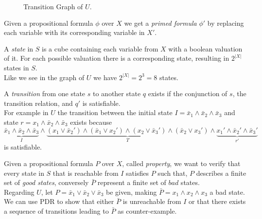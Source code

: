 \documentclass[11pt, a4paper, BCOR=10mm, ngerman, oneside]{scrbook}
\begin{document}
\begin{figure}[H]
\centering

\caption{Transition Graph of $U$.}
\label{ex1}
\end{figure}

Given a propositional formula $\phi$ over $X$ we get a \textsl{primed formula} $\phi'$ by replacing each variable with its corresponding variable in $X'$. \par

A \textsl{state} in $S$ is a cube containing each variable from $X$ with a boolean valuation of it. For each possible valuation there is a corresponding state, resulting in $2^{|X|}$ states in $S$. \\
Like we see in the graph of $U$ we have $2^{|X|} = 2^3 = 8$ states.

A \textsl{transition} from one state $s$ to another state $q$ exists if the conjunction of $s$, the transition relation, and $q'$ is satisfiable.\\ For example in $U$ the transition between the initial state $I = \bar x_1 \land \bar x_2 \land \bar x_3$ and state $r = x_1 \land \bar x_2 \land \bar x_3$ exists because
\begin{equation*}
\underbrace{\bar x_1 \land \bar x_2 \land \bar x_3}_{I} \land \underbrace{(x_1 \lor \bar x_2' ) \land ( \bar x_1 \lor x_2') \land (x_2 \lor \bar x_3') \land ( \bar x_2 \lor x_3')}_T \land \underbrace{x_1' \land \bar x_2' \land \bar x_3'}_{r'}
\end{equation*}
is satisfiable.\par

Given a propositional formula $P$ over $X$, called \textsl{property}, we want
to verify that every state in $S$ that is reachable from
$I$ satisfies $P$ such that, $P$ describes a finite set of \textsl{good states}, conversely $\bar P$ represent a finite set of $bad$ states.  \\ 
Regarding $U$, let $P = \bar x_1 \lor \bar x_2 \lor \bar x_3$ be given, making $\bar P = x_1 \land x_2 \land x_3$ a bad state. \\ 
We can use PDR to show that either $\bar P$ is unreachable from $I$ or that there exists a sequence of transitions leading to $\bar P$ as counter-example.
\end{document}
